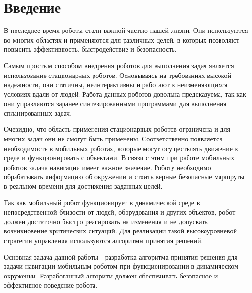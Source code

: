\chapter*{Введение}
\label{ch:intro}

В последнее время роботы стали важной частью нашей жизни. Они используются во многих областях и применяются для различных целей, в которых позволяют повысить эффективность, быстродействие и безопасность. 

Самым простым способом внедрения роботов для выполнения задач является использование стационарных роботов. Основываясь на требованиях высокой надежности, они статичны, неинтерактивны и работают в неизменяющихся условиях вдали от людей. Работа данных роботов довольна предсказуема, так как они управляются заранее синтезированными программами для выполнения спланированных задач.

Очевидно, что область применения стационарных роботов ограничена и для многих задач они не смогут быть применены. Соответственно появляется необходимость в мобильных роботах, которые могут осуществлять движение в среде и функционировать с объектами. В связи с этим при работе мобильных роботов задача навигации имеет важное значение. Роботу необходимо обрабатывать информацию об окружении и стоить верные безопасные маршруты в реальном времени для достижения заданных целей. 

Так как мобильный робот функционирует в динамической среде в непосредственной близости от людей, оборудования и других объектов, робот должен достаточно быстро реагировать на изменения и не допускать возникновение критических ситуаций. Для реализации такой высокоуровневой стратегии управления используются алгоритмы принятия решений.

Основная задача данной работы - разработка алгоритма принятия решения для задачи навигации мобильным роботом при функционировании в динамическом окружении. Разработанный алгоритм должен обеспечивать безопасное и эффективное поведение робота.

\endinput